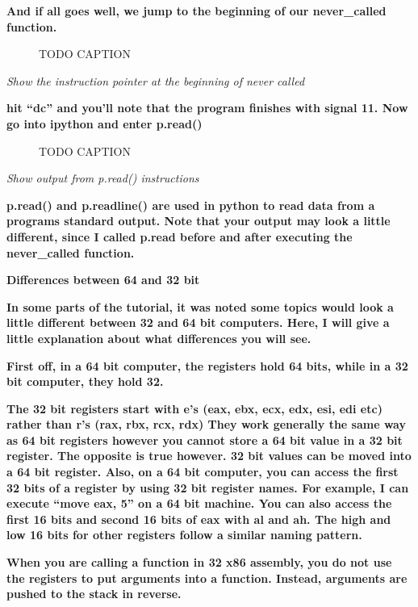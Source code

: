 \documentclass[letterpaper]{article}
\newcommand{\sitfig}[3]{
\begin{figure}[H]
\centering
\makebox[\textwidth][c]{
#2
}
\caption{#3}
\label{#1}
\end{figure}
}
\newcommand{\sitgfx}[4][scale=1.0]{
\sitfig{#3}{\texttt{[image: \#2]}}{#4}
}
\begin{document}
\textbf{And if all goes well, we jump to the beginning of our never\_called function.}

  
\sitgfx[width=5.8335in,height=3.6457in]{FINALWORKINGDOCFORMERLYPRECURSOR-img096.png}{fig:unk}{TODO CAPTION}
 

\textit{Show the instruction pointer at the beginning of never called}

\textbf{hit ``dc'' and you'll note that the program finishes with signal 11. Now go into ipython and enter p.read()}

  
\sitgfx[width=5.8335in,height=3.6457in]{FINALWORKINGDOCFORMERLYPRECURSOR-img108.png}{fig:unk}{TODO CAPTION}
 

\textit{Show output from p.read() instructions}

\textbf{p.read() and p.readline() are used in python to read data from a programs standard output. Note that your output
may look a little different, since I called p.read before and after executing the never\_called function.}

{\centering
\textbf{Differences between 64 and 32 bit}
\par}

\textbf{In some parts of the tutorial, it was noted some topics would look a little different between 32 and 64 bit
computers. Here, I will give a little explanation about what differences you will see. }

\textbf{First off, in a 64 bit computer, the registers hold 64 bits, while in a 32 bit computer, they hold 32. }

\textbf{The 32 bit registers start with e's (eax, ebx, ecx, edx, esi, edi etc) rather than r's (rax, rbx, rcx, rdx) They
work generally the same way as 64 bit registers however you cannot store a 64 bit value in a 32 bit register. The
opposite is true however. 32 bit values can be moved into a 64 bit register. Also, on a 64 bit computer, you can access
the first 32 bits of a register by using 32 bit register names. For example, I can execute ``move eax, 5'' on a 64 bit
machine. You can also access the first 16 bits and second 16 bits of eax with al and ah. The high and low 16 bits for
other registers follow a similar naming pattern. }

\textbf{When you are calling a function in 32 x86 assembly, you do not use the registers to put arguments into a
function. Instead, arguments are pushed to the stack in reverse. }
\end{document}
